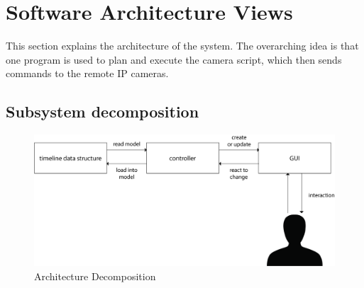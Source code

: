 \documentclass[11pt,twoside,a4paper]{article}
\begin{document}
\clearpage %

\section{Software Architecture Views}
This section explains the architecture of the system. The overarching idea is that one program is used to plan and execute the camera script, which then sends commands to the remote IP cameras.
\subsection{Subsystem decomposition}
\begin{figure}[H]
	\centering
	\includegraphics[width=\textwidth]{architecture-decomposition}
	\caption{Architecture Decomposition}
	\label{fig:archdecomp}
\end{figure}
\end{document}
